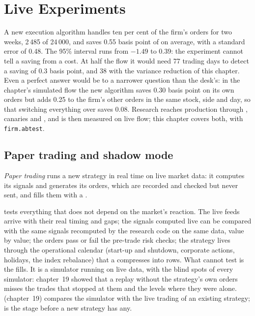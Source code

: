 \chapter{Live Experiments}\label{ch:rs:live-experiments}

A new execution algorithm handles ten per cent of the firm's orders for two weeks, 2\,485 of 24\,000, and saves 0.55 basis point of 
on average, with a standard error of 0.48. The 95\% interval runs from $-1.49$ to 0.39: the experiment cannot tell a saving from a cost. At half the flow it
would need 77 trading days to detect a saving of 0.3 basis point, and 38 with the variance reduction of this chapter. Even a perfect answer would be to a
narrower question than the desk's: in the chapter's simulated flow the new algorithm saves 0.30 basis point on its own orders but adds 0.25 to the firm's
other orders in the same stock, side and day, so that switching everything over saves 0.08. Research reaches production through , canaries
and , and is then measured on live flow; this chapter covers both, with \texttt{firm.abtest}.

\section{Paper trading and shadow mode}

\begin{definition}\label{def:rs:live-experiments:paper}
\emph{Paper trading} runs a new strategy in real time on live market data: it computes its signals and generates its orders, which are
recorded and checked but never sent, and fills them with a .
\end{definition}

 tests everything that does not depend on the market's reaction. The live feeds arrive with their real timing and gaps; the signals computed
live can be compared with the same signals recomputed by the research code on the same data, value by value; the orders pass or fail the pre-trade risk
checks; the strategy lives through the operational calendar (start-up and shutdown, corporate actions, holidays, the index rebalance) that a 
compresses into rows. What  cannot test is the fills. It is a simulator running on live data, with the blind spots of every simulator: chapter~19
showed that a replay without the strategy's own orders misses the trades that stopped at them and the levels where they were alone. 
(chapter~19) compares the simulator with the live trading of an existing strategy;  is the stage before a new strategy has any.

